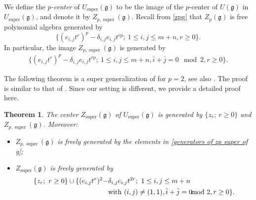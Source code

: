 \documentclass[12pt,reqno]{amsart}
\newcommand{\fg}{\mathfrak{g}}
\DeclareMathOperator{\super}{super}
\numberwithin{equation}{section}
\newtheorem{Theorem}{Theorem}[section]
\theoremstyle{Theorem}
\theoremstyle{remark}
\numberwithin{equation}{section}
\begin{document}
We define the {\it $p$-center} of $U_{\super}(\fg)$ to be the image of the $p$-center of $U(\fg)$ in $U_{\super}(\fg)$,
and denote it by $Z_{p,\super}(\fg)$.
Recall from \eqref{zpg} that $Z_p(\fg)$ is free polynomial algebra generated by 
\[
\{(e_{i,j}t^r)^p-\delta_{i,j}e_{i,j}t^{rp};~1\leq i,j\leq m+n, r\geq 0\}.
\]
In particular, the image $Z_{p,\super}(\fg)$ is generated by 
\begin{align}\label{generators of zp super of g}
\{(e_{i,j}t^r)^p-\delta_{i,j}e_{i,j}t^{rp};~1\leq i,j\leq m+n, \bar i+\bar j=0\!\!\!\!\! \mod 2, r\geq 0\}.    
\end{align}

The following theorem is a super generalization of \cite[Theorem 3.4]{BT18} for $p=2$, see also \cite[Theorem 2.3]{CH23}.
The proof is similar to that of \cite[Theorem 3.4]{BT18}.
Since our setting is different, we provide a detailed proof here.
\begin{Theorem}\label{theorem: center Zsuper g}
The center $Z_{\super}(\fg)$ of $U_{\super}(\fg)$ is generated by $\{z_r;~r\geq 0\}$ and $Z_{p,\super}(\fg)$.
Moreover:
\begin{itemize}
\item[(1)] $Z_{p,\super}(\fg)$ is freely generated by the elements in \eqref{generators of zp super of g};
\item[(2)] $Z_{\super}(\fg)$ is freely generated by 
\begin{align}\label{generators of zsuper g}
\{z_r;~r\geq 0\}\cup\{(e_{i,j}t^r)^2-&\delta_{i,j}e_{i,j}t^{2r};~1\leq i, j\leq m+n~\\\nonumber
&{\rm with}~(i,j)\neq (1,1), \bar i+\bar j=0\!\!\!\!\! \mod 2, r\geq 0\}.      
\end{align}

\end{itemize}
\end{Theorem}
\end{document}
